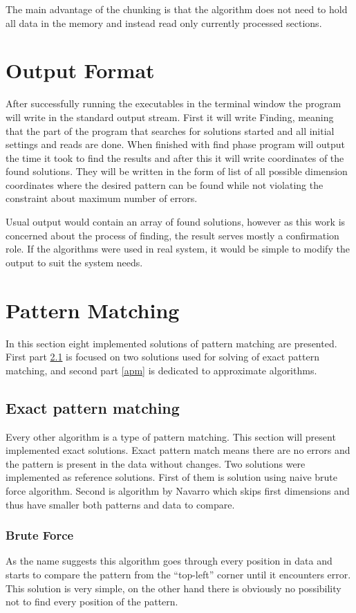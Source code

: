 The main advantage of the chunking is that the algorithm does not need to hold all data in the memory and instead read only currently processed sections.

\section{Output Format}
After successfully running the executables in the terminal window the program will write in the standard output stream. First it will write Finding, meaning that the part of the program that searches for solutions started and all initial settings and reads are done. When finished with find phase program will output the time it took to find the results and after this it will write coordinates of the found solutions. They will be written in the form of list of all possible dimension coordinates where the desired pattern can be found while not violating the constraint about maximum number of errors.

Usual output would contain an array of found solutions, however as this work is concerned about the process of finding, the result serves mostly a confirmation role. If the algorithms were used in real system, it would be simple to modify the output to suit the system needs.

\section{Pattern Matching}
In this section eight implemented solutions of pattern matching are presented. First part \ref{epm} is focused on two solutions used for solving of exact pattern matching, and second part \ref{apm} is dedicated to approximate algorithms.

\subsection{Exact pattern matching}\label{epm}
Every other algorithm is a type of pattern matching. This section will present implemented exact solutions. Exact pattern match means there are no errors and the pattern is present in the data without changes. Two solutions were implemented as reference solutions. First of them is solution using naive brute force algorithm. Second is algorithm by Navarro which skips first dimensions and thus have smaller both patterns and data to compare.

\subsubsection{Brute Force}
As the name suggests this algorithm goes through every position in data and starts to compare the pattern from the ``top-left'' corner until it encounters error. This solution is very simple, on the other hand there is obviously no possibility not to find every position of the pattern.

